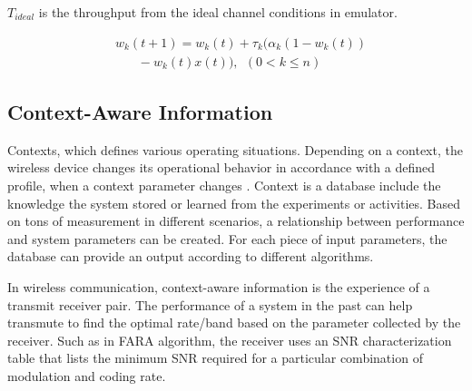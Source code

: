 $T_{ideal}$ is the throughput from the ideal channel conditions in emulator. 





\begin{align}
&w_{k}(t+1) = w_{k}(t) + \tau_{k}(\alpha_{k}(1 - w_{k}(t))\nonumber \\
&~~~~~~~~- w_{k}(t)x(t)),~~(0<k\le{n})
\label{eq:habituation}
\end{align}


\subsection{Context-Aware Information}



Contexts, which defines various operating situations. Depending on a context, the wireless device changes its operational 
behavior in accordance with a defined profile, when a context parameter changes \cite{phillips2004wireless}. Context is a database include the knowledge the system stored or learned from the experiments or activities. Based on tons of measurement in different scenarios, a relationship between performance and system parameters can be created. 
For each piece of input parameters, the database can provide an output according to different algorithms.

In wireless communication, context-aware information is the experience of a transmit receiver pair. The performance of a system in the past can help transmute to find the optimal rate/band based on the parameter collected by the receiver. Such as in FARA algorithm, the receiver uses an SNR characterization table that lists the minimum SNR required for a particular combination of modulation and coding rate\cite{rahul2009frequency}. 


